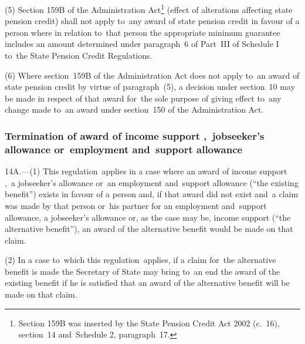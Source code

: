 \documentclass[12pt,a4paper]{article}
\begin{document}
(5) Section 159B of the Administration Act\footnote{Section 159B was inserted by the State Pension Credit Act 2002 (c.\ 16), section~14 and~Schedule 2, paragraph~17.} (effect of alterations affecting state pension credit) shall not apply to~any award of state pension credit in favour of a person where in relation to~that person the appropriate minimum guarantee includes an amount determined under paragraph~6 of Part~III of Schedule I to~the State Pension Credit Regulations.

(6) Where section~159B of the Administration Act does not apply to~an award of state pension credit by virtue of paragraph~(5), a decision under section~10 may be made in respect of that award for~the sole purpose of giving effect to~any change made to~an award under section~150 of the Administration Act.


\subsubsection[14A. Termination of award of income support%
,~jobseeker’s allowance or~employment and~support allowance%
]{Termination of award of income support%
,~jobseeker’s allowance or~employment and~support allowance%
}

14A.---(1)  This regulation~applies in a case where an award of income support%
,~a jobseeker’s allowance or~an employment and~support allowance  %
(“the existing benefit”) exists in favour of a person and, if that award did not exist and~a claim was made by that person or~his partner for 
an employment and~support allowance,  %
a jobseeker’s allowance or, as the case may be, income support (“the alternative benefit”), an award of the alternative benefit would be made on that claim.

(2) In a case to~which this regulation~applies, if a claim for~the alternative benefit is made the Secretary of State may bring to~an end the award of the existing benefit if he is satisfied that an award of the alternative benefit will be made on that claim.
\end{document}
